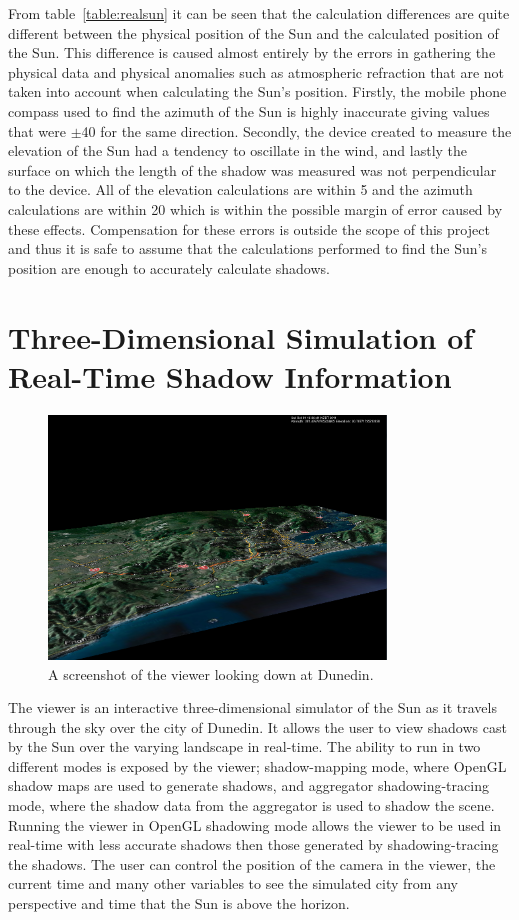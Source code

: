 \documentclass[12pt]{report}
\begin{document}
From table~\ref{table:realsun} it can be seen that the calculation differences are quite different between the physical position of the Sun and the calculated position of the Sun. This difference is caused almost entirely by the errors in gathering the physical data and physical anomalies such as atmospheric refraction that are not taken into account when calculating the Sun's position. Firstly, the mobile phone compass used to find the azimuth of the Sun is highly inaccurate giving values that were $\pm$40{\degree} for the same direction. Secondly, the device created to measure the elevation of the Sun had a tendency to oscillate in the wind, and lastly the surface on which the length of the shadow was measured was not perpendicular to the device. All of the elevation calculations are within 5{\degree} and the azimuth calculations are within 20{\degree} which is within the possible margin of error caused by these effects. Compensation for these errors is outside the scope of this project and thus it is safe to assume that the calculations performed to find the Sun's position are enough to accurately calculate shadows.

\chapter{Three-Dimensional Simulation of Real-Time Shadow Information}

\begin{figure}[h]
\centering
\includegraphics[width=0.8\textwidth]{viewer.png}
\caption{A screenshot of the viewer looking down at Dunedin.}
\label{image:viewer}
\end{figure}

The viewer is an interactive three-dimensional simulator of the Sun as it travels through the sky over the city of Dunedin. It allows the user to view shadows cast by the Sun over the varying landscape in real-time. The ability to run in two different modes is exposed by the viewer; shadow-mapping mode, where OpenGL shadow maps are used to generate shadows, and aggregator shadowing-tracing mode, where the shadow data from the aggregator is used to shadow the scene. Running the viewer in OpenGL shadowing mode allows the viewer to be used in real-time with less accurate shadows then those generated by shadowing-tracing the shadows. The user can control the position of the camera in the viewer, the current time and many other variables to see the simulated city from any perspective and time that the Sun is above the horizon.
\end{document}
